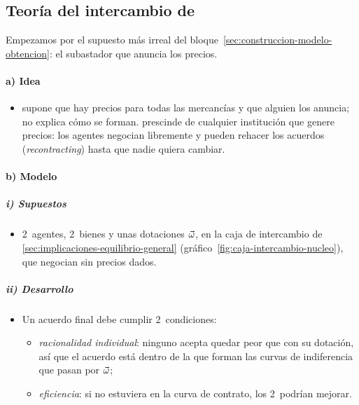 \documentclass[11pt]{article}
\begin{document}
\subsection{Teoría del intercambio de }\label{sec:teoria-intercambio-edgeworth}

Empezamos por el supuesto más irreal del bloque~\ref{sec:construccion-modelo-obtencion}: el subastador que anuncia los precios.

\paragraph{a) Idea}

\begin{itemize}
\item {} supone que hay precios para todas las mercancías y que alguien los anuncia; no explica cómo se forman. \textcite{Edgeworth1881Mathematical} prescinde de cualquier institución que genere precios: los agentes negocian libremente y pueden rehacer los acuerdos (\emph{recontracting}) hasta que nadie quiera cambiar.
\end{itemize}

\paragraph{b) Modelo}

\subparagraph{i) Supuestos}

\begin{itemize}
\item 2~agentes, 2~bienes y unas dotaciones $\vec{\omega}$, en la caja de intercambio de \ref{sec:implicaciones-equilibrio-general} (gráfico~\ref{fig:caja-intercambio-nucleo}), que negocian sin precios dados.
\end{itemize}

\subparagraph{ii) Desarrollo}

\begin{itemize}
\item Un acuerdo final debe cumplir 2~condiciones:
  \begin{itemize}
  \item \emph{racionalidad individual}: ninguno acepta quedar peor que con su dotación, así que el acuerdo está dentro de la  que forman las curvas de indiferencia que pasan por $\vec{\omega}$;
  \item \emph{eficiencia}: si no estuviera en la curva de contrato, los 2~podrían mejorar.
  \end{itemize}
\end{itemize}
\end{document}
